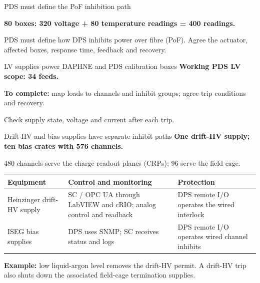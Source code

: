 \begin{frame}{PDS must define the PoF inhibition path}
\centering

\par\smallskip
\raggedright{}\par\smallskip
\raggedright

\textbf{80 boxes: 320 voltage + 80 temperature readings = 400 readings.}\par\medskip
PDS must define how DPS inhibits power over fibre (PoF). Agree the actuator, affected boxes, response time, feedback and recovery.
\end{frame}

\begin{frame}{LV supplies power DAPHNE and PDS calibration boxes}
\textbf{Working PDS LV scope: 34 feeds.}\par\medskip
\centering
{}\par\smallskip
\raggedright{}\par\medskip
\raggedright
\textbf{To complete:} map loads to channels and inhibit groups; agree trip conditions and recovery.\par\medskip
Check supply state, voltage and current after each trip.
\end{frame}

\begin{frame}{Drift HV and bias supplies have separate inhibit paths}
\textbf{One drift-HV supply; ten bias crates with 576 channels.}\par
480 channels serve the charge readout planes (CRPs); 96 serve the field cage.\par\bigskip
\renewcommand{\arraystretch}{1.35}
\begin{tabularx}{\textwidth}{@{}>{\RaggedRight\arraybackslash}p{2.1cm}>{\RaggedRight\arraybackslash}X>{\RaggedRight\arraybackslash}X@{}}
\toprule
\textbf{Equipment} & \textbf{Control and monitoring} & \textbf{Protection}\\\midrule
Heinzinger drift-HV supply & SC / OPC UA through LabVIEW and cRIO; analog control and readback & DPS remote I/O operates the wired interlock\\
ISEG bias supplies & DPS uses SNMP; SC receives status and logs & DPS remote I/O operates wired channel inhibits\\
\bottomrule
\end{tabularx}\par\bigskip
\textbf{Example:} low liquid-argon level removes the drift-HV permit. A drift-HV trip also shuts down the associated field-cage termination supplies.
\end{frame}

